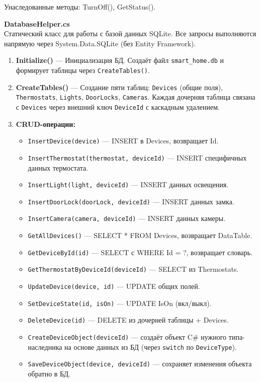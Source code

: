 \documentclass[oneside,a4paper,14pt]{extarticle}
\begin{document}
Унаследованные методы: TurnOff(), GetStatus().

\newpage

\textbf{DatabaseHelper.cs}\\

Статический класс для работы с базой данных SQLite. Все запросы выполняются напрямую через System.Data.SQLite (без Entity Framework).

\begin{enumerate}
\item \textbf{Initialize()} — Инициализация БД. Создаёт файл \texttt{smart\_home.db} и формирует таблицы через \texttt{CreateTables()}.

\item \textbf{CreateTables()} — Создание пяти таблиц: \texttt{Devices} (общие поля), \texttt{Thermostats}, \texttt{Lights}, \texttt{DoorLocks}, \texttt{Cameras}. Каждая дочерняя таблица связана с \texttt{Devices} через внешний ключ \texttt{DeviceId} с каскадным удалением.

\item \textbf{CRUD-операции:}
\begin{itemize}
    \item \texttt{InsertDevice(device)} — INSERT в Devices, возвращает Id.
    \item \texttt{InsertThermostat(thermostat, deviceId)} — INSERT специфичных данных термостата.
    \item \texttt{InsertLight(light, deviceId)} — INSERT данных освещения.
    \item \texttt{InsertDoorLock(doorLock, deviceId)} — INSERT данных замка.
    \item \texttt{InsertCamera(camera, deviceId)} — INSERT данных камеры.
    \item \texttt{GetAllDevices()} — SELECT * FROM Devices, возвращает DataTable.
    \item \texttt{GetDeviceById(id)} — SELECT с WHERE Id = ?, возвращает словарь.
    \item \texttt{GetThermostatByDeviceId(deviceId)} — SELECT из Thermostats.
    \item \texttt{UpdateDevice(device, id)} — UPDATE общих полей.
    \item \texttt{SetDeviceState(id, isOn)} — UPDATE IsOn (вкл/выкл).
    \item \texttt{DeleteDevice(id)} — DELETE из дочерней таблицы + Devices.
    \item \texttt{CreateDeviceObject(deviceId)} — создаёт объект C# нужного типа-наследника на основе данных из БД (через \texttt{switch} по \texttt{DeviceType}).
    \item \texttt{SaveDeviceObject(device, deviceId)} — сохраняет изменения объекта обратно в БД.
\end{itemize}

\end{enumerate}
\end{document}
